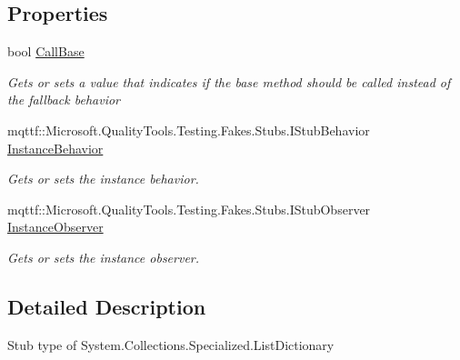 \subsection*{Properties}
\begin{DoxyCompactItemize}
\item 
bool \hyperlink{class_system_1_1_collections_1_1_specialized_1_1_fakes_1_1_stub_list_dictionary_adc4b6612fcb3e401f7103ec7cebe0c34}{Call\-Base}
\begin{DoxyCompactList}\small\item\em Gets or sets a value that indicates if the base method should be called instead of the fallback behavior\end{DoxyCompactList}\item 
mqttf\-::\-Microsoft.\-Quality\-Tools.\-Testing.\-Fakes.\-Stubs.\-I\-Stub\-Behavior \hyperlink{class_system_1_1_collections_1_1_specialized_1_1_fakes_1_1_stub_list_dictionary_aaf2bf1679c05b849262563df635795f7}{Instance\-Behavior}
\begin{DoxyCompactList}\small\item\em Gets or sets the instance behavior.\end{DoxyCompactList}\item 
mqttf\-::\-Microsoft.\-Quality\-Tools.\-Testing.\-Fakes.\-Stubs.\-I\-Stub\-Observer \hyperlink{class_system_1_1_collections_1_1_specialized_1_1_fakes_1_1_stub_list_dictionary_a94cc45768161d503b50b1fa1e02195ea}{Instance\-Observer}
\begin{DoxyCompactList}\small\item\em Gets or sets the instance observer.\end{DoxyCompactList}\end{DoxyCompactItemize}


\subsection{Detailed Description}
Stub type of System.\-Collections.\-Specialized.\-List\-Dictionary



